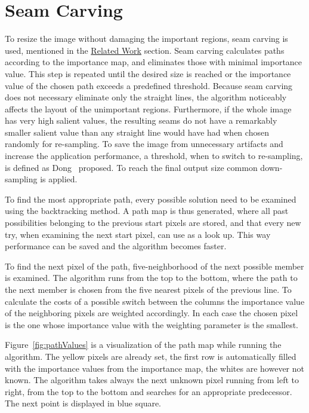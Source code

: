 \documentclass[draft,final]{vutinfth} %
\begin{document}
	\section{Seam Carving}
	To resize the image without damaging the important regions, seam carving is used, mentioned in the \hyperref[seamCarving]{Related Work} section.
	Seam carving calculates paths according to the importance map, and eliminates those with minimal importance value.
	This step is repeated until the desired size is reached or the importance value of the chosen path exceeds a predefined threshold.
	Because seam carving does not necessary eliminate only the straight lines, the algorithm noticeably affects the layout of the unimportant regions.
	Furthermore, if the whole image has very high salient values, the resulting seams do not have a remarkably smaller salient value than any straight line would have had when chosen randomly for re-sampling.
	To save the image from unnecessary artifacts and increase the application performance, a threshold, when to switch to re-sampling, is defined as Dong~\cite{dong2009optimized} proposed.
	To reach the final output size common down-sampling is applied.\par 
	To find the most appropriate path, every possible solution need to be examined using the backtracking method.
	A path map is thus generated, where all past possibilities belonging to the previous start pixels are stored, and that every new try, when examining the next start pixel, can use as a look up.
	This way performance can be saved and the algorithm becomes faster.\par 
	To find the next pixel of the path, five-neighborhood of the next possible member is examined.
	The algorithm runs from the top to the bottom, where the path to the next member is chosen from the five nearest pixels of the previous line.
	To calculate the costs of a possible switch between the columns the importance value of the neighboring pixels are weighted accordingly.
	In each case the chosen pixel is the one whose importance value with the weighting parameter is the smallest.\par
	Figure~\ref{fig:pathValues} is a visualization of the path map while running the algorithm.
	The yellow pixels are already set, the first row is automatically filled with the importance values from the importance map, the whites are however not known.
	The algorithm takes always the next unknown pixel running from left to right, from the top to the bottom and searches for an appropriate predecessor.
	The next point is displayed in blue square.
\end{document}

